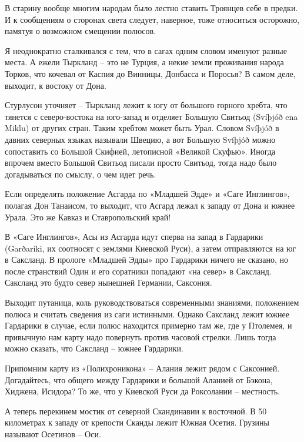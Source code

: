 В старину вообще многим народам было лестно ставить Троянцев себе в предки. И к сообщениям о сторонах света следует, наверное, тоже относиться  осторожно, памятуя о возможном смещении полюсов.

Я неоднократно сталкивался с тем, что в сагах одним словом именуют разные места. А ежели Тыркланд – это не Турция, а некие земли проживания народа Торков, что кочевал от Каспия до Винницы, Донбасса и Поросья? В самом деле, выходит, к востоку от Дона.

Стурлусон уточняет – Тыркланд лежит к югу от большого горного хребта, что тянется с северо-востока на юго-запад и отделяет Большую Свитьод (Svíþjóð ena Miklu) от других стран. Таким хребтом может быть Урал. Словом Svíþjóð в давних северных языках называли Швецию, а вот Большую Svíþjóð можно сопоставить со Большой Скифией, летописной «Великой Скуфью». Иногда впрочем вместо Большой Свитьод писали просто Свитьод, тогда надо было догадываться по смыслу, о чем идет речь.

Если определять положение Асгарда по «Младшей Эдде» и «Саге Инглингов», полагая Дон Танаисом, то выходит, что Асгард лежал к западу от Дона и южнее Урала. Это же Кавказ и Ставропольский край!

В «Саге Инглингов», Асы из Асгарда идут сперва на запад в Гардарики (Garðaríki, их соотносят с землями Киевской Руси), а затем отправляются на юг в Саксланд. В прологе «Младшей Эдды» про Гардарики ничего не сказано, но после странствий Один и его соратники попадают «на север» в Саксланд. Саксланд это будто север нынешней Германии, Саксония.

Выходит путаница, коль руководствоваться современными знаниями, положением полюса и считать сведения из саги истинными. Однако Саксланд лежит южнее Гардарики в случае, если полюс находится примерно там же, где у Птолемея, и привычную нам карту надо повернуть против часовой стрелки. Лишь тогда можно сказать, что Саксланд – южнее Гардарики.

Припомним карту из «Полихроникона» – Алания лежит рядом с Саксонией. Догадайтесь, что общего между Гардарики и большой Аланией от Бэкона, Хиджена, Исидора? То же, что у Киевской Руси да Роксолании – местность.


А теперь перекинем мостик от северной Скандинавии к восточной. В 50 километрах к западу от крепости Сканды лежит Южная Осетия. Грузины называют Осетинов – Оси. 

